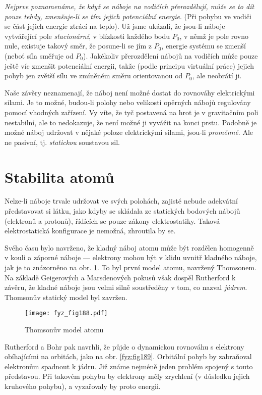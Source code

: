{  \emph{Nejprve poznamenáme, že když se náboje na vodičích přerozdělují, může se to dít pouze 
  tehdy, zmenšuje-li se tím jejich potenciální energie}. (Při pohybu ve vodiči se část jejich 
  energie ztrácí na teplo). Už jsme ukázali, že jsou-li náboje vytvářející pole 
  \emph{stacionární}, v blízkosti každého bodu \(P_0\), v němž je pole rovno nule, existuje 
  takový směr, že posune-li se jím z \(P_0\), energie systému se zmenší (neboť síla směřuje od 
  \(P_0\)). Jakékoliv přerozdělení nábojů na vodičích může pouze ještě víc zmenšit potenciální 
  energii, takže (podle principu virtuální práce) jejich pohyb jen zvětší sílu ve zmíněném 
  směru orientovanou od \(P_0\), ale neobrátí ji.
  
  Naše závěry neznamenají, že náboj není možné dostat do rovnováhy elektrickými silami. Je to 
  možné, budou-li polohy nebo velikosti opěrných nábojů regulovány pomocí vhodných zařízení. Vy 
  víte, že tyč postavená na hrot je v gravitačním poli nestabilní, ale to nedokazuje, že není 
  možné ji vyvážit na konci prstu. Podobně je možné náboj udržovat v nějaké poloze elektrickými 
  silami, jsou-li \emph{proměnné}. Ale ne pasivní, tj. \emph{statickou} soustavou sil.

\section{Stabilita atomů}\label{fyz:IIchapVsecIII}
  Nelze-li náboje trvale udržovat ve svých polohách, zajisté nebude adekvátní představovat si 
  látku, jako kdyby se skládala ze statických bodových nábojů (elektronů a protonů), řídících 
  se pouze zákony elektrostatiky. Taková elektrostatická konfigurace je nemožná, zhroutila by 
  se.
  
  Svého času bylo navrženo, že kladný náboj atomu může být rozdělen homogenně v kouli a záporné 
  náboje — elektrony mohou být v klidu uvnitř kladného náboje, jak je to znázorněno na obr. 
  \ref{fyz:fig188}. To byl první model atomu, navržený Thomsonem. Na základě Geigerových a 
  Marsdenových pokusů však dospěl Rutherford k závěru, že kladné náboje jsou velmi silně 
  soustředěny v tom, co nazval \emph{jádrem}. Thomsonův statický model byl zavržen.
  \begin{figure}[ht!] %
    \centering
    \texttt{[image: fyz\_fig188.pdf]}
    \caption{Thomsonův model atomu}
    \label{fyz:fig188}
  \end{figure}
  
  Rutherford a Bohr pak navrhli, že půjde o dynamickou rovnováhu s elektrony obíhajícími na 
  orbitách, jako na obr. \ref{fyz:fig189}. Orbitální pohyb by zabraňoval 
  elektronům spadnout k jádru. Již známe nejméně jeden problém spojený s touto představou. Při 
  takovém pohybu by elektrony měly zrychlení (v důsledku jejich kruhového pohybu), a vyzařovaly 
  by proto energii.
  
}
